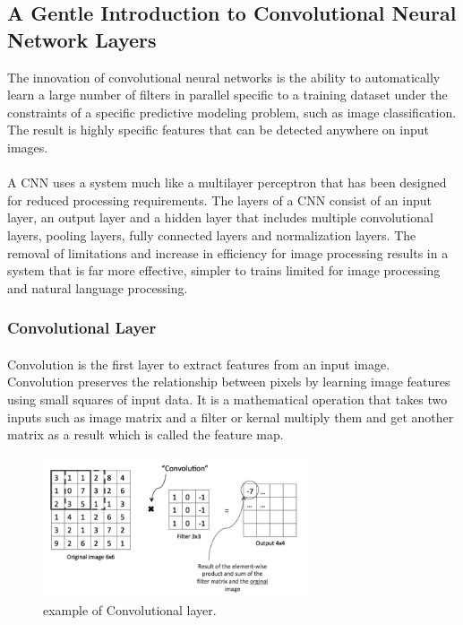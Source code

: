 \subsection{A Gentle Introduction to Convolutional Neural Network Layers }   
The innovation of convolutional neural networks is the ability to automatically learn a large number of filters in parallel specific to a training dataset under the constraints of a specific predictive modeling problem, such as image classification. The result is highly specific features that can be detected anywhere on input images.
\paragraph{}
A CNN uses a system much like a multilayer perceptron that has been designed for reduced processing requirements. The layers of a CNN consist of an input layer, an output layer and a hidden layer that includes multiple convolutional layers, pooling layers, fully connected layers and normalization layers. The removal of limitations and increase in efficiency for image processing results in a system that is far more effective, simpler to trains limited for image processing and natural language processing.
\subsubsection{Convolutional Layer}
\paragraph{}
Convolution is the first layer to extract features from an input image. Convolution preserves the relationship between pixels by learning image features using small squares of input data. It is a mathematical operation that takes two inputs such as image matrix and a filter or kernal multiply them and get another matrix as a result which  is called the feature map.
\begin{figure}
	\centering
	\includegraphics[width=0.7\textwidth]{conv_layer.png}
	\caption{example of Convolutional layer.}
\end{figure}
